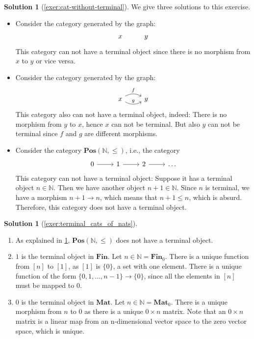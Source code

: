\documentclass[a4paper,11pt, oneside,titlepage=false]{scrbook}
\theoremstyle{plain}
\theoremstyle{definition}
\newtheorem{solution}[thm]{Solution}
\newcommand{\Catb}[1]{\mathbf{#1}}
\newcommand{\POS}{\Catb{Pos}}
\newcommand{\MAT}{\Catb{Mat}}
\newcommand{\SKELFINSET}{\Catb{Fin}}
\newcommand{\NN}{\ensuremath{\mathbb{N}}}
\begin{document}
\begin{solution}[\cref{exer:cat-without-terminal}]\label{sol:cat-without-terminal}
We give three solutions to this exercise.
\begin{itemize}
\item Consider the category generated by the graph:
\[
\begin{tikzcd}
x & y
\end{tikzcd}
\]
This category can not have a terminal object since there is no morphism from $x$ to $y$ or vice versa.
\item Consider the category generated by the graph:
\[
\begin{tikzcd}
x \arrow[r, bend left, "f"] \arrow[r, bend right, "g"] & y
\end{tikzcd}
\]
This category also can not have a terminal object, indeed: There is no morphism from $y$ to $x$, hence $x$ can not be terminal. But also $y$ can not be terminal since $f$ and $g$ are different morphisms.
\item Consider the category $ \POS(\NN, \leq) $, i.e., the category
\[
\begin{tikzcd}
	0 \arrow[r] & 1 \arrow[r] & 2 \arrow[r] & \dots
\end{tikzcd}
\]
This category can not have a terminal object: Suppose it has a terminal object $ n \in \NN $. Then we have another object $ n + 1 \in \NN $. Since $ n $ is terminal, we have a morphism $ n + 1 \to n $, which means that $ n + 1 \leq n $, which is absurd. Therefore, this category does not have a terminal object.
\end{itemize}
\end{solution}

\begin{solution}[\cref{exer:terminal_cats_of_nats}]\label{sol:terminal_cats_of_nats}
	\begin{enumerate}
		\item As explained in \cref{sol:cat-without-terminal}, $\POS(\NN,\leq)$ does not have a terminal object.
		\item $1$ is the terminal object in $\SKELFINSET$. Let $n \in \NN = \SKELFINSET_0$. There is a unique function from $[n]$ to $[1]$, as $[1]$ is $\{0\}$, a set with one element. There is a unique function of the form $\{0, 1, \dots, n-1\} \to \{ 0 \}$, since all the elements in $[n]$ must be mapped to $0$.
		\item $0$ is the terminal object in $\MAT$. Let $n \in \NN = \MAT_0$. There is a unique morphism from $n$ to $0$ as there is a unique $0 \times n$ matrix.
		Note that an $0 \times n$ matrix is a linear map from an n-dimensional vector space to the zero vector space, which is unique.
	\end{enumerate}
\end{solution}
\end{document}
